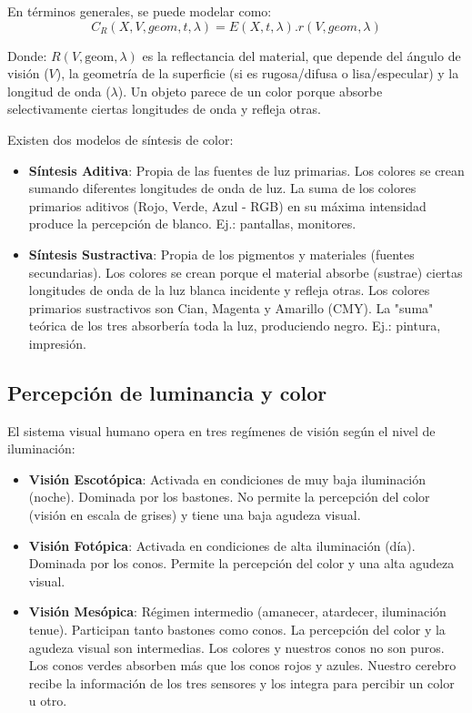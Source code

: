 En términos generales, se puede modelar como:
$$C_R(X, V, geom, t, \lambda) = E(X, t, \lambda).r(V, geom, \lambda)$$

Donde:
$R(V, \text{geom}, \lambda)$ es la reflectancia del material, que depende del ángulo de visión ($V$), la geometría de la superficie (si es rugosa/difusa o lisa/especular) y la longitud de onda ($\lambda$). Un objeto parece de un color porque absorbe selectivamente ciertas longitudes de onda y refleja otras.

Existen dos modelos de síntesis de color:
\begin{itemize}
\item \textbf{Síntesis Aditiva}: Propia de las fuentes de luz primarias. Los colores se crean sumando diferentes longitudes de onda de luz. La suma de los colores primarios aditivos (Rojo, Verde, Azul - RGB) en su máxima intensidad produce la percepción de blanco. Ej.: pantallas, monitores.
\item \textbf{Síntesis Sustractiva}: Propia de los pigmentos y materiales (fuentes secundarias). Los colores se crean porque el material absorbe (sustrae) ciertas longitudes de onda de la luz blanca incidente y refleja otras. Los colores primarios sustractivos son Cian, Magenta y Amarillo (CMY). La "suma" teórica de los tres absorbería toda la luz, produciendo negro. Ej.: pintura, impresión.
\end{itemize}

\subsection{Percepción de luminancia y color}
El sistema visual humano opera en tres regímenes de visión según el nivel de iluminación:
\begin{itemize}
\item \textbf{Visión Escotópica}: Activada en condiciones de muy baja iluminación (noche). Dominada por los bastones. No permite la percepción del color (visión en escala de grises) y tiene una baja agudeza visual.
\item \textbf{Visión Fotópica}: Activada en condiciones de alta iluminación (día). Dominada por los conos. Permite la percepción del color y una alta agudeza visual.
\item \textbf{Visión Mesópica}: Régimen intermedio (amanecer, atardecer, iluminación tenue). Participan tanto bastones como conos. La percepción del color y la agudeza visual son intermedias.
Los colores y nuestros conos no son puros. Los conos verdes absorben más que los conos rojos y azules. Nuestro cerebro recibe la información de los tres sensores y los integra para percibir un color u otro. 
\end{itemize}

